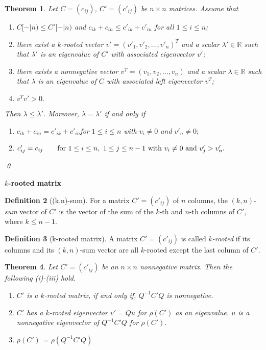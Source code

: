 \documentclass{article}
\theoremstyle{plain}
\newtheorem{thm}{Theorem}[section]
\theoremstyle{definition}
\newtheorem{defn}[thm]{Definition}
\begin{document}
\begin{thm} \label{thm_main}
    Let $C=(c_{ij})$, $C'=(c'_{ij})$ be  $n\times n$ matrices.
Assume that
\begin{enumerate}
\item[(i)]   $C[-|n)\leq C'[-|n)$ and $c_{ik}+c_{in}\leq c'_{ik}+c'_{in}$ for all $1\leq i\leq n$;
\item[(ii)] there exist a $k$-rooted vector $v'=(v'_1, v'_2, \ldots, v'_n)^T$ and a scalar $\lambda'\in \mathbb{R}$
such that $\lambda'$ is an eigenvalue of $C'$ with associated eigenvector $v'$;
\item[(iii)] there exists a nonnegative vector $v^T=(v_1, v_2, \ldots, v_n)$ and a scalar $\lambda\in \mathbb{R}$ such that $\lambda$ is an eigenvalue of $C$ with associated left eigenvector $v^T$;
\item[(iv)] $v^Tv'>0.$
\end{enumerate}
 Then $\lambda\leq \lambda'$.
Moreover, $\lambda=\lambda'$
if and only if
\begin{enumerate}
\item[(a)] $c_{ik}+c_{in}=c'_{ik}+c'_{in}$\qquad for $1\leq i\leq n$ with $v_i\not=0$ and $v'_n\not=0;$
\item[(b)]
$c'_{ij}=c_{ij}\qquad \hbox{for~}1\leq i\leq n,~1\leq j\leq n-1 \hbox{~with~} v_i\ne 0 \hbox{~and~} v'_j> v'_n.$
\end{enumerate} \qed
\end{thm}




{\bf $k$-rooted matrix}

\begin{defn}[(k,n)-sum]
For a matrix $C'=(c'_{ij})$ of $n$ columns, the $(k, n)$-{\it sum} vector of $C'$ is the vector of the sum of the $k$-th and  $n$-th columns of $C'$, where $k\leq n-1$.
\end{defn}

\begin{defn}[k-rooted matrix]
A  matrix $C'=(c'_{ij})$ is called {\it $k$-rooted}  if its  columns and its $(k, n)$-sum vector are all $k$-rooted except the last column of $C'$.
\end{defn}

\begin{thm}
Let $C'=(c'_{ij})$ be an $n\times n$ nonnegative matrix. Then the following (i)-(iii) hold.
    \begin{enumerate}
        \item[(i)]$C'$ is a $k$-rooted matrix, if and only if, $Q^{-1}C'Q$ is nonnegative.
        \item[(ii)]$C'$ has a $k$-rooted eigenvector $v'=Qu$ for $\rho(C')$ as an eigenvalue. $u$ is a nonnegative eigenvector of $Q^{-1}C'Q$ for $\rho(C')$.
        \item[(iii)] $\rho(C')$ = $\rho(Q^{-1}C'Q)$
    \end{enumerate}
\end{thm}
\end{document}
